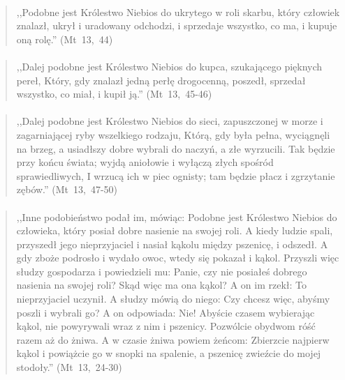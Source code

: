 \documentclass[10pt,a4paper,oneside]{article}
\begin{document}
\paragraph{}
\begin{quote}
,,Podobne jest Królestwo Niebios do ukrytego w roli skarbu, który człowiek znalazł, ukrył i uradowany odchodzi, i sprzedaje wszystko, co ma, i kupuje oną rolę.'' \mbox{(Mt 13, 44)}
\end{quote}
\paragraph{}
\begin{quote}
,,Dalej podobne jest Królestwo Niebios do kupca, szukającego pięknych pereł, Który, gdy znalazł jedną perłę drogocenną, poszedł, sprzedał wszystko, co miał, i kupił ją.'' \mbox{(Mt 13, 45-46)}
\end{quote}
\paragraph{}
\begin{quote}
,,Dalej podobne jest Królestwo Niebios do sieci, zapuszczonej w morze i zagarniającej ryby wszelkiego rodzaju, Którą, gdy była pełna, wyciągnęli na brzeg, a usiadłszy dobre wybrali do naczyń, a złe wyrzucili. Tak będzie przy końcu świata; wyjdą aniołowie i wyłączą złych spośród sprawiedliwych, I wrzucą ich w piec ognisty; tam będzie płacz i zgrzytanie zębów.'' \mbox{(Mt 13, 47-50)}
\end{quote}
\paragraph{}
\begin{quote}
,,Inne podobieństwo podał im, mówiąc: Podobne jest Królestwo Niebios do człowieka, który posiał dobre nasienie na swojej roli. A kiedy ludzie spali, przyszedł jego nieprzyjaciel i nasiał kąkolu między pszenicę, i odszedł. A gdy zboże podrosło i wydało owoc, wtedy się pokazał i kąkol. Przyszli więc słudzy gospodarza i powiedzieli mu: Panie, czy nie posiałeś dobrego nasienia na swojej roli? Skąd więc ma ona kąkol? A on im rzekł: To nieprzyjaciel uczynił. A słudzy mówią do niego: Czy chcesz więc, abyśmy poszli i wybrali go? A on odpowiada: Nie! Abyście czasem wybierając kąkol, nie powyrywali wraz z nim i pszenicy. Pozwólcie obydwom róść razem aż do żniwa. A w czasie żniwa powiem żeńcom: Zbierzcie najpierw kąkol i powiążcie go w snopki na spalenie, a pszenicę zwieźcie do mojej stodoły.'' \mbox{(Mt 13, 24-30)}
\end{quote}
\end{document}

